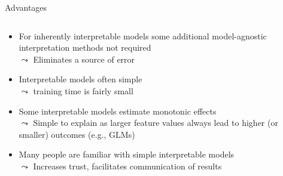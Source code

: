 \documentclass[11pt,compress,t,notes=noshow, aspectratio=169, xcolor=table]{beamer}
\begin{document}
\begin{frame}{Advantages}
\begin{columns}[T, totalwidth=\textwidth]
\begin{column}{0.75\textwidth}
    \begin{itemize}[<+->]
    \itemsep1em
        \item For inherently interpretable models some additional model-agnostic interpretation methods not required \\
        $\leadsto$ Eliminates a source of error
        \item Interpretable models often simple \\
        $\leadsto$ training time is fairly small
        \item Some interpretable models estimate monotonic effects \\
        $\leadsto$ Simple to explain as larger feature values always lead to higher (or smaller) outcomes (e.g., GLMs)
        \item Many people are familiar with simple interpretable models \\
        $\leadsto$ Increases trust, facilitates communication of results
    \end{itemize}
\end{column}
\begin{column}{0.25\textwidth}
    \begin{center}
\end{center}
\end{column}
\end{columns}
\end{frame}
\end{document}
